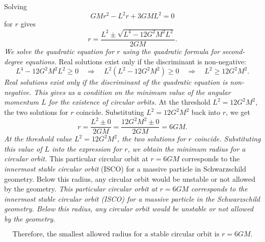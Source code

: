 Solving
\begin{equation*}
GM r^2 - L^2 r + 3 G M L^2 = 0
\end{equation*}
for $r$ gives
\begin{equation*}
r = \frac{L^2 \pm \sqrt{L^4 - 12 G^2 M^2 L^2}}{2 G M}.
\end{equation*}
\textit{We solve the quadratic equation for $r$ using the quadratic formula for second-degree equations.}
Real solutions exist only if the discriminant is non-negative:
\begin{equation*}
L^4 - 12 G^2 M^2 L^2 \ge 0
\quad \Longrightarrow \quad
L^2 \left(L^2 - 12 G^2 M^2\right) \ge 0
\quad \Longrightarrow \quad
L^2 \ge 12 G^2 M^2.
\end{equation*}
\textit{Real solutions exist only if the discriminant of the quadratic equation is non-negative. This gives us a condition on the minimum value of the angular momentum $L$ for the existence of circular orbits.}
At the threshold $L^2 = 12 G^2 M^2$, the two solutions for $r$ coincide. Substituting $L^2 = 12 G^2 M^2$ back into $r$, we get
\begin{equation*}
r = \frac{L^2 \pm 0}{2 G M} = \frac{12 G^2 M^2 \pm 0}{2 G M} = 6 G M.
\end{equation*}
\textit{At the threshold value $L^2 = 12 G^2 M^2$, the two solutions for $r$ coincide. Substituting this value of $L$ into the expression for $r$, we obtain the minimum radius for a circular orbit.}
This particular circular orbit at $r = 6 G M$ corresponds to the \emph{innermost stable circular orbit} (ISCO) for a massive particle in Schwarzschild geometry. Below this radius, any circular orbit would be unstable or not allowed by the geometry.
\textit{This particular circular orbit at $r = 6 G M$ corresponds to the innermost stable circular orbit (ISCO) for a massive particle in the Schwarzschild geometry. Below this radius, any circular orbit would be unstable or not allowed by the geometry.}


\[
\boxed{
\text{Therefore, the smallest allowed radius for a stable circular orbit is } r = 6 G M.
}
\]
